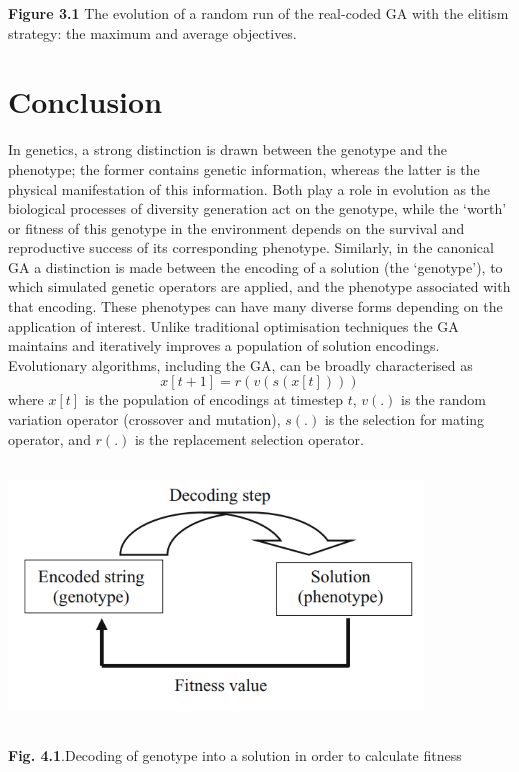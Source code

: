 \documentclass[14pt]{article}
\numberwithin{equation}{subsection}
\begin{document}
		\noindent \textbf{Figure 3.1} The evolution of a random run of the real-coded GA with the elitism strategy: the
		maximum and average objectives.
		
	  \section{Conclusion}In genetics, a strong distinction is drawn between the genotype and the phenotype; the
		former contains genetic information, whereas the latter is the physical manifestation of this information. Both
		play a role in evolution as the biological processes of diversity generation act on the genotype, while the
		‘worth’ or fitness of this genotype in the environment depends on the survival and reproductive success of its
		corresponding phenotype. Similarly, in the canonical GA a distinction is made between the encoding of a
		solution (the ‘genotype’), to which simulated genetic operators are applied, and the phenotype associated with
		that encoding. These phenotypes can have many diverse forms depending on the application of interest. Unlike
		traditional optimisation techniques the GA maintains and iteratively improves a population of solution
		encodings. Evolutionary algorithms, including the GA, can be broadly characterised as 
		\[x[t + 1] = r(v(s(x[t])))\]
		where $x[t]$ is the population of encodings at timestep $t$, $v(.)$ is the random variation operator (crossover
		and mutation), $s(.)$ is the selection for mating operator, and $r(.)$ is the replacement selection operator. 
		
		\begin{center}
				\includegraphics[width=11cm, height=7cm]{figure_4-1.PNG}
		\end{center}
		
		\noindent \textbf{Fig. 4.1}.Decoding of genotype into a solution in order to calculate fitness
	
\end{document}
